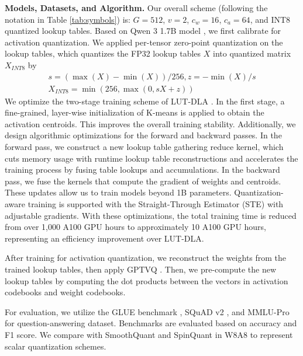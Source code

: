 \documentclass[conference]{IEEEtran}
\begin{document}
\noindent \textbf{Models, Datasets, and Algorithm.} Our overall scheme (following the notation in Table \ref{tab:symbols}) is: $G = 512$, $v = 2$, $c_w = 16$, $c_a = 64$, and INT8 quantized lookup tables. Based on Qwen 3 1.7B model \cite{yang2025qwen3}, we first calibrate for activation quantization. We applied per-tensor zero-point quantization \cite{jacob2018quantization} on the lookup tables, which quantizes the FP32 lookup tables $X$ into quantized matrix $X_{INT8}$ by
\begin{equation}
\begin{split}
    s = (\max(X)-\min(X))/256, z = - \min(X) / s \\
    X_{INT8} = \min(256, \max(0, sX+z))
\end{split}
\end{equation}
We optimize the two-stage training scheme of LUT-DLA \cite{li2025lut}. In the first stage, a fine-grained, layer-wise initialization of K-means is applied to obtain the activation centroids. This improves the overall training stability. Additionally, we design algorithmic optimizations for the forward and backward passes. In the forward pass, we construct a new lookup table gathering reduce kernel, which cuts memory usage with runtime lookup table reconstructions and accelerates the training process by fusing table lookups and accumulations. In the backward pass, we fuse the kernels that compute the gradient of weights and centroids. These updates allow us to train models beyond 1B parameters. Quantization-aware training is supported with the Straight-Through Estimator (STE) \cite{yin2019understanding} with adjustable gradients. With these optimizations, the total training time is reduced from over 1,000 A100 GPU hours to approximately 10 A100 GPU hours, representing an efficiency improvement over LUT-DLA. 

After training for activation quantization, we reconstruct the weights from the trained lookup tables, then apply GPTVQ \cite{van2024gptvq}. Then, we pre-compute the new lookup tables by computing the dot products between the vectors in activation codebooks and weight codebooks. 

For evaluation, we utilize the GLUE benchmark \cite{wang2018glue}, SQuAD v2 \cite{rajpurkar2016squad}, and MMLU-Pro \cite{wang2024mmlu} for question-answering dataset. Benchmarks are evaluated based on accuracy and F1 score. We compare with SmoothQuant \cite{xiao2023smoothquant} and SpinQuant \cite{liu2024spinquant} in W8A8 to represent scalar quantization schemes.
\end{document}
